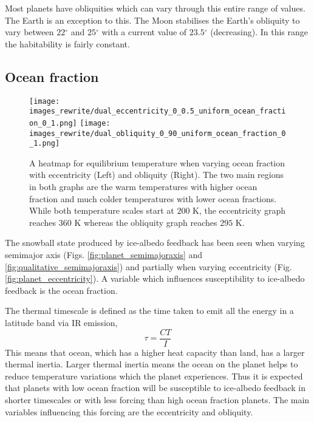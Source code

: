 \documentclass[12pt, onecolumn]{revtex4-2}    %
\newcommand{\degrees}{\ensuremath{^{\circ}}}
\begin{document}
Most planets have obliquities which can vary through this entire range of values.
The Earth is an exception to this. 
The Moon stabilises the Earth's obliquity to vary between $22\degrees$ and $25\degrees$ with a current value of $23.5\degrees$ (decreasing).
In this range the habitability is fairly constant.


\subsection{Ocean fraction} \label{ssec:qualitative_oceanfraction}
\begin{figure}
  \texttt{[image: images\_rewrite/dual\_eccentricity\_0\_0.5\_uniform\_ocean\_fraction\_0\_1.png]}
  \texttt{[image: images\_rewrite/dual\_obliquity\_0\_90\_uniform\_ocean\_fraction\_0\_1.png]}
  \caption{
    A heatmap for equilibrium temperature when varying ocean fraction with eccentricity (Left) and obliquity (Right).
    The two main regions in both graphs are the warm temperatures with higher ocean fraction and much colder temperatures with lower ocean fractions.
    While both temperature scales start at $200$ K, the eccentricity graph reaches $360$ K whereas the obliquity graph reaches $295$ K.
  }
  \label{fig:qualitative_oceanfraction}
\end{figure}

The snowball state produced by ice-albedo feedback has been seen when varying semimajor axis (Figs. \ref{fig:planet_semimajoraxis} and \ref{fig:qualitative_semimajoraxis}) and partially when varying eccentricity (Fig. \ref{fig:planet_eccentricity}).
A variable which influences susceptibility to ice-albedo feedback is the ocean fraction.

The thermal timescale is defined as the time taken to emit all the energy in a latitude band via IR emission,
\begin{equation}
  \tau = \frac{C T}{I}
  \label{eq:thermal_time_scale}
\end{equation}
This means that ocean, which has a higher heat capacity than land, has a larger thermal inertia.
Larger thermal inertia means the ocean on the planet helps to reduce temperature variations which the planet experiences.
Thus it is expected that planets with low ocean fraction will be susceptible to ice-albedo feedback in shorter timescales or with less forcing than high ocean fraction planets.
The main variables influencing this forcing are the eccentricity and obliquity.
\end{document}
